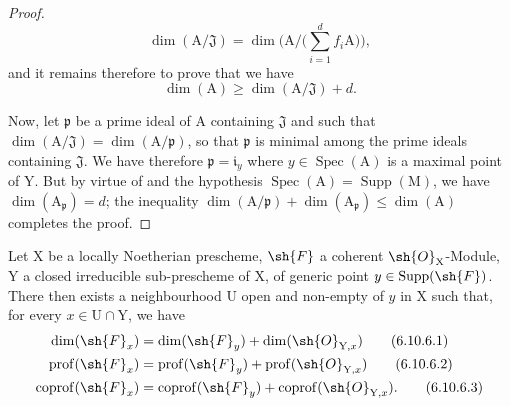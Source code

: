 \begin{proof}
\[
\dim(\mathrm{A}/\mathfrak{J})=\dim\Big(\mathrm{A}/\Big(\sum_{i=1}^d f_i\mathrm{A}\Big)\Big),
\]
and it remains therefore to prove  that we have
\[
\dim(\mathrm{A})\geqslant\dim(\mathrm{A}/\mathfrak{J})+d.
\]

Now, let $\mathfrak{p}$ be a prime ideal of $\mathrm{A}$ containing $\mathfrak{J}$ and such that $\dim(\mathrm{A}/\mathfrak{J})=\dim(\mathrm{A}/\mathfrak{p})$, so that $\mathfrak{p}$ is minimal among the prime ideals containing $\mathfrak{J}$. We have therefore $\mathfrak{p}=\mathfrak{i}_y$ where $y\in\operatorname{Spec}(\mathrm{A})$ is a maximal point of $\mathrm{Y}$. But by virtue of  and the hypothesis $\operatorname{Spec}(\mathrm{A})=\operatorname{Supp}(\mathrm{M})$, we have $\dim(\mathrm{A}_\mathfrak{p})=d$; the inequality $\dim(\mathrm{A}/\mathfrak{p})+\dim(\mathrm{A}_\mathfrak{p})\leqslant\dim(\mathrm{A})$  completes the proof.
\end{proof}

\begin{proposition}[6.10.6]
\label{IV.6.10.6}
Let $\mathrm{X}$ be a locally Noetherian prescheme, $\sh{F}$ a coherent $\sh{O}_\mathrm{X}$-Module, $\mathrm{Y}$ a closed irreducible sub-prescheme of $\mathrm{X}$, of generic point $y\in\operatorname{Supp}(\sh{F})$. There then exists a neighbourhood $\mathrm{U}$ open and non-empty of $y$ in $\mathrm{X}$ such that, for every $x\in\mathrm{U}\cap\mathrm{Y}$, we have
\begin{align}
  \dim(\sh{F}_x) &= \dim(\sh{F}_y)+\dim(\sh{O}_{\mathrm{Y},x}) \tag{6.10.6.1}\label{IV.6.10.6.1}\\
  \operatorname{prof}(\sh{F}_x) &= \operatorname{prof}(\sh{F}_y)+\operatorname{prof}(\sh{O}_{\mathrm{Y},x}) \tag{6.10.6.2}\label{IV.6.10.6.2}\\
  \operatorname{coprof}(\sh{F}_x) &= \operatorname{coprof}(\sh{F}_y)+\operatorname{coprof}(\sh{O}_{\mathrm{Y},x}). \tag{6.10.6.3}\label{IV.6.10.6.3}
\end{align}
\end{proposition}

